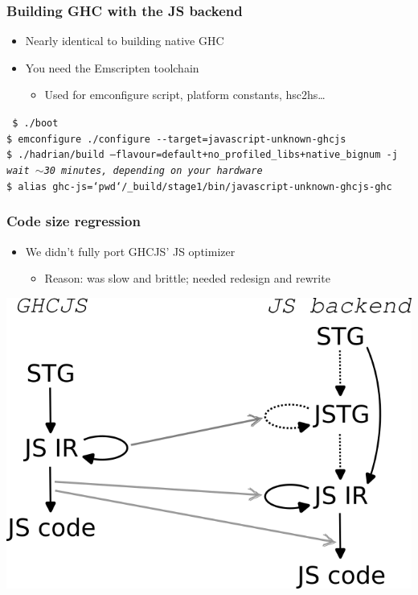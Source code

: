 \documentclass{beamer}
\begin{document}
\begin{frame}[fragile]
\frametitle{Building GHC with the JS backend}
\begin{itemize}
\item Nearly identical to building native GHC
\item You need the Emscripten toolchain
\begin{itemize}
\item Used for emconfigure script, platform constants, hsc2hs…
\end{itemize}
\end{itemize}

\vspace{1cm}

\texttt
{\footnotesize
\$ ./boot \\
\$ \alert{emconfigure} ./configure -{}-target=\alert{javascript-unknown-ghcjs} \\
\$ ./hadrian/build --flavour=default+no\_profiled\_libs+\alert{native\_bignum} -j \\
\vspace{0.5cm}
\textit{wait $\sim$30 minutes, depending on your hardware} \\
\vspace{0.5cm}
\$ alias ghc-js=`pwd`/\_build/stage1/bin/javascript-unknown-ghcjs-ghc\\
}
\end{frame}


\begin{frame}
\frametitle{Code size regression}
\begin{itemize}
\item We didn’t fully port GHCJS’ JS optimizer
\begin{itemize}
\item Reason: was slow and brittle; needed redesign and rewrite
\end{itemize}
\end{itemize}
\hspace{1cm}
\begin{center}
\includegraphics[scale=0.4]{images/pipelines.png}
\end{center}
\end{frame}
\end{document}
